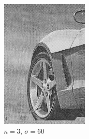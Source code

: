 \documentclass[
	12pt, %
]{style/fphw}
\begin{document}
\begin{figure}[H]
\begin{subfigure}[b]{.22\textwidth}
             \includegraphics[width=\textwidth]{Q5_3_2_60.png}
             \caption{$n=3$, $\sigma=60$}
             \label{Q5_3_3_60.tif}
         \end{subfigure}
         \hfill
         \begin{subfigure}[b]{.22\textwidth}
             \centering

\end{subfigure}
\end{figure}
\end{document}
